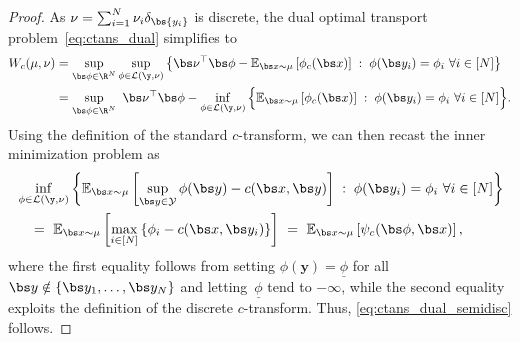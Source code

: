\documentclass[11pt, a4paper, oneside, reqno]{article}
\begin{document}
	\begin{proof}
		As $\nu = \sum_{i=1}^N {\nu}_i\delta_{\bs {y_i}}$ is discrete, the dual optimal transport problem~\eqref{eq:ctans_dual} simplifies to
		\begin{align*}
		W_c(\mu, \nu) & =\sup_{\bs \phi\in\R^N} \sup_{\phi \in \mathcal{L}(\y, \nu)} \left\{ \bs \nu^\top\bs \phi - \mathbb{E}_{\bs x \sim \mu}\left[ \phi_c(\bs x) \right]\;:\;\phi(\bs y_i)=\phi_i~\forall i\in[N] \right\}\\
		&=\sup_{\bs \phi\in\R^N}~ \bs \nu^\top\bs \phi - \inf_{\phi \in \mathcal{L}(\y, \nu)} \Big\{  \mathbb{E}_{\bs x \sim \mu}\left[ \phi_c(\bs x) \right]\;:\;\phi(\bs y_i)=\phi_i~\forall i\in[N] \Big\} . 
		\end{align*}
		Using the definition of the standard $c$-transform, we can then recast the inner minimization problem as
		\begin{align*}
		&\inf_{\phi \in \mathcal{L}(\y, \nu)} \left\{  \mathbb{E}_{\bs x \sim \mu}\left[ \sup_{\bs y \in \mathcal{Y}} \phi(\bs y) - c(\bs x, \bs y) \right]\;:\;\phi(\bs y_i)=\phi_i~\forall i\in[N] \right\}\\
		&\quad = ~\mathbb{E}_{\bs x \sim \mu} \left[\max_{i \in [N]}\left\{\phi_i- c(\bs x, \bs y_i)\right\} \right] ~=~ \mathbb{E}_{\bs x \sim \mu} \left[{\psi_c(\bs \phi, \bs x) } \right],
		\end{align*}
		where the first equality follows from setting $\phi(\bm y)=\underline \phi$ for all $\bs y\notin\{\bs y_1, \ldots, \bs y_N\}$ and letting~$\underline\phi$ tend to $-\infty$, while the second equality exploits the definition of the discrete $c$-transform. Thus, \eqref{eq:ctans_dual_semidisc} follows.
	\end{proof}
	
\end{document}
